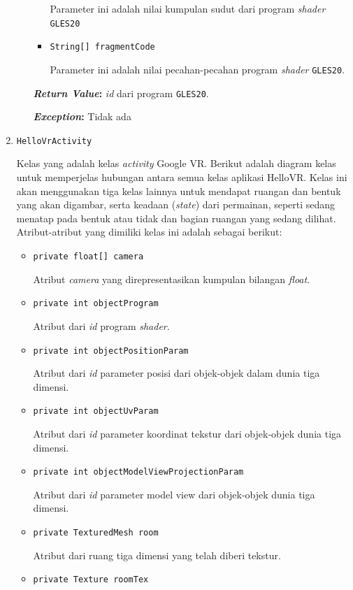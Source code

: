 \begin{enumerate}
\begin{itemize}
\begin{itemize}
			Parameter ini adalah nilai kumpulan sudut dari program \textit{shader} \texttt{GLES20}	
			\item \texttt{String[] fragmentCode}
			
			Parameter ini adalah nilai pecahan-pecahan program \textit{shader} \texttt{GLES20}.		
		\end{itemize}
		\textbf{\textit{Return Value}:} \textit{id} dari program \texttt{GLES20}.
			
		\textbf{\textit{Exception}:} Tidak ada
	\end{itemize}
	
	
	\item \texttt{HelloVrActivity}
	
	Kelas yang adalah kelas {\it activity} Google VR. Berikut adalah diagram kelas untuk memperjelas hubungan antara semua kelas aplikasi HelloVR. Kelas ini akan menggunakan tiga kelas lainnya untuk mendapat ruangan dan bentuk yang akan digambar, serta keadaan ({\it state}) dari permainan, seperti sedang menatap pada bentuk atau tidak dan bagian ruangan yang sedang dilihat. Atribut-atribut yang dimiliki kelas ini adalah sebagai berikut:

	\begin{itemize}
  		\item \texttt{private float[] camera}
  		
  		Atribut \textit{camera} yang direpresentasikan kumpulan bilangan \textit{float}.
  		\item \texttt{private int objectProgram}
  		
  		Atribut dari \textit{id} program \textit{shader}.
  		\item \texttt{private int objectPositionParam}
  		
  		Atribut dari \textit{id} parameter posisi dari objek-objek dalam dunia tiga dimensi.
  		\item \texttt{private int objectUvParam}
  		
  		Atribut dari \textit{id} parameter koordinat tekstur dari objek-objek dunia tiga dimensi.
  		\item \texttt{private int objectModelViewProjectionParam}
  		
  		Atribut dari \textit{id} parameter model view dari objek-objek dunia tiga dimensi.
  		\item \texttt{private TexturedMesh room}
  		
  		Atribut dari ruang tiga dimensi yang telah diberi tekstur.
  		\item \texttt{private Texture roomTex}
  		

\end{itemize}
\end{enumerate}
